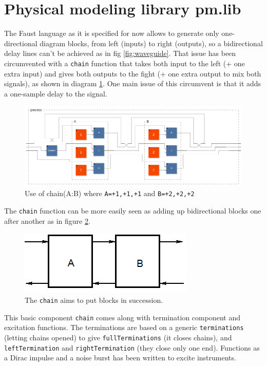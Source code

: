 \documentclass[11pt,a4paper]{article}
\begin{document}
\section{Physical modeling library pm.lib}

The Faust language as it is specified for now allows to generate only one-directional diagram blocks, from left (inputs) to right (outputs), so a bidirectional delay lines can't be achieved as in fig \ref{fig:waveguide}. That issue has been circumvented with a \texttt{chain} function that takes both input to the left (+ one extra input) and gives both outputs to the fight (+ one extra output to mix both signals), as shown in diagram \ref{fig:chain}. One main issue of this circumvent is that it adds a one-sample delay to the signal.

\begin{figure}[h]
	\centering
	\includegraphics[scale=0.3]{pictures/chain.png}
	\caption{Use of chain(A:B) where \texttt{A=+1,+1,+1} and \texttt{B=+2,+2,+2}}
	\label{fig:chain}
\end{figure}

 The \texttt{chain} function can be more easily seen as adding up bidirectional blocks one after another as in figure \ref{fig:chainrepresentation}.

\begin{figure}[h]
	\centering
	\includegraphics[scale=0.5]{pictures/chainrepresentation.png}
	\caption{The \texttt{chain} aims to put blocks in succession.}
	\label{fig:chainrepresentation}
\end{figure}

This basic component \texttt{chain} comes along with termination component and excitation functions. The terminations are based on a generic \texttt{terminations} (letting chains opened) to give \texttt{fullTerminations} (it closes chains), and \texttt{leftTermination} and \texttt{rightTermination} (they close only one end). Functions as a Dirac impulse and a noise burst \cite{lac_orlarey} has been written to excite instruments.\\
\end{document}
